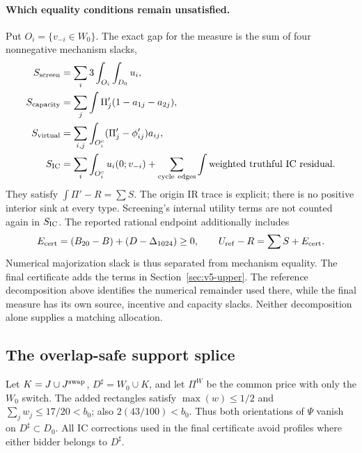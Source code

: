 \paragraph{Which equality conditions remain unsatisfied.}
Put $O_i=\{v_{-i}\in W_0\}$. The exact gap for the measure is the sum
of four nonnegative mechanism slacks,
\begin{align*}
 S_{\rm screen}&=\sum_i3\int_{O_i}\int_{D_0}u_i,\\
 S_{\rm capacity}&=\sum_j\int\Pi'_j(1-a_{1j}-a_{2j}),\\
 S_{\rm virtual}&=\sum_{i,j}\int_{O_i^c}(\Pi'_j-\phi'_{ij})a_{ij},\\
 S_{\rm IC}&=\sum_i\int_{O_i^c}u_i(0;v_{-i})
   +\sum_{\rm cycle\ edges}\int\text{weighted truthful IC residual}.
\end{align*}
They satisfy $\int\Pi'-R=\sum S$. The origin IR trace is explicit;
there is no positive interior sink at every type. Screening's internal
utility terms are not counted again in $S_{\rm IC}$.
The reported rational endpoint additionally includes
\[
 E_{\rm cert}=(B_{20}-B)+(D-\Delta_{1024})\ge0,
 \qquad U_{\rm ref}-R=\sum S+E_{\rm cert}.
\]
Numerical majorization slack is thus separated from mechanism equality.
The final certificate adds the terms in Section~\ref{sec:v5-upper}.
The reference decomposition above identifies the numerical remainder used
there, while the final measure has its own source, incentive and capacity
slacks. Neither decomposition alone supplies a matching allocation.

\subsection{The overlap-safe support splice}\label{app:overlap}
Let $K=J\cup J^{\rm swap}$, $D^\sharp=W_0\cup K$, and let $\Pi^W$
be the common price with only the $W_0$ switch. The added rectangles satisfy
$\max(w)\le1/2$ and $\sum_jw_j\le17/20<b_0$; also $2(43/100)<b_0$.
Thus both orientations of $\Psi$ vanish on $D^\sharp\subset D_0$.
All IC corrections used in the final certificate avoid profiles where
either bidder belongs to $D^\sharp$.

